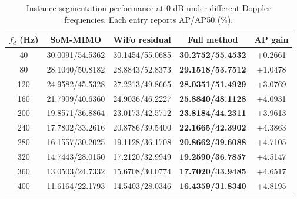 \begin{table}[t]
\centering
\caption{Instance segmentation performance at 0 dB under different Doppler frequencies. Each entry reports AP/AP50 (\%).}
\label{tab:doppler_main}
\begin{tabular}{c|ccc|c}
\hline
$f_d$ (Hz) & SoM-MIMO & WiFo residual & Full method & AP gain \\
\hline
40 & 30.0091/54.5362 & 30.1454/55.0685 & \textbf{30.2752/55.4532} & +0.2661 \\
80 & 28.1040/50.8182 & 28.8843/52.8373 & \textbf{29.1518/53.7512} & +1.0478 \\
120 & 24.9582/45.5328 & 27.2213/49.8665 & \textbf{28.0351/51.4929} & +3.0769 \\
160 & 21.7909/40.6360 & 24.9036/46.2227 & \textbf{25.8840/48.1128} & +4.0931 \\
200 & 19.8571/36.8864 & 23.0173/42.5712 & \textbf{23.8184/44.2311} & +3.9613 \\
240 & 17.7802/33.2616 & 20.8786/39.5400 & \textbf{22.1665/42.3902} & +4.3863 \\
280 & 16.1557/30.2025 & 19.1128/36.1708 & \textbf{20.8662/39.6088} & +4.7105 \\
320 & 14.7443/28.0150 & 17.2120/32.9949 & \textbf{19.2590/36.7857} & +4.5147 \\
360 & 13.0503/24.7332 & 15.6708/30.0774 & \textbf{17.7020/33.9485} & +4.6517 \\
400 & 11.6164/22.1793 & 14.5403/28.0346 & \textbf{16.4359/31.8340} & +4.8195 \\
\hline
\end{tabular}
\end{table}
